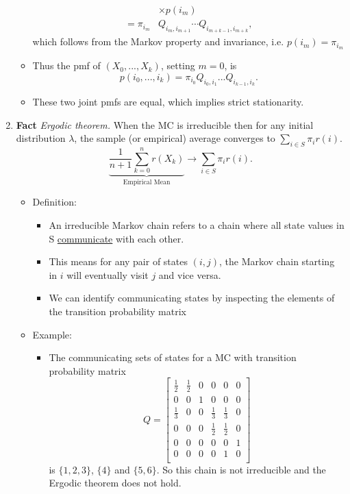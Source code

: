 \documentclass[12pt]{article}
\begin{document}
\begin{enumerate}
\begin{itemize}
\begin{align*}
               & \times p(i_{m}) \\
               =\pi_{i_m}&Q_{i_m,i_{m+1}}\cdots Q_{i_{m+k-1},i_{m+k}},
    \end{align*}                  
    which follows from the Markov property and invariance, i.e. $p(i_m)=\pi_{i_m}$
    \item Thus the pmf of $(X_0,...,X_k)$, setting $m=0$, is 
    \[
    p(i_0,...,i_k) = \pi_{i_0}Q_{i_0,i_1}...Q_{i_{k-1},i_k}.
    \]
    \item These two joint pmfs are equal, which implies strict stationarity.          
\end{itemize}
\item \textbf{Fact} \textit{Ergodic theorem.} When the MC is irreducible then for any initial distribution $\lambda$, the sample (or empirical) average converges to $\sum_{i\in S}\pi_i r(i)$.
\[
\underbrace{\frac{1}{n+1}\sum_{k=0}^n r(X_k)}_\text{Empirical Mean} \rightarrow \sum_{i \in S} \pi_i r(i).
\]
\begin{itemize}
    \item Definition:
    \begin{itemize}
    \item An irreducible Markov chain refers to a chain where all state values in S \underline{communicate} with each other.
    \item This means for any pair of states $(i,j)$, the Markov chain starting in $i$ will eventually visit $j$ and vice versa.
    \item We can identify communicating states by inspecting the elements of the transition probability matrix
    \end{itemize}
    \item Example:
    \begin{itemize}
        \item The communicating sets of states for a MC with transition probability matrix 
        \[
        Q = \begin{bmatrix}
        \frac{1}{2} & \frac{1}{2} & 0 & 0 & 0 & 0 \\
        0 & 0 & 1 & 0 & 0 & 0 \\
        \frac{1}{3} & 0 & 0 & \frac{1}{3} & \frac{1}{3} & 0 \\
        0 & 0 & 0 & \frac{1}{2} & \frac{1}{2} & 0 \\
        0 & 0 & 0 & 0 & 0 & 1 \\
        0 & 0 & 0 & 0 & 1 & 0 \\
        \end{bmatrix}
        \]
        is $\{1,2,3 \}$, $\{ 4\}$ and $\{5,6\}$. So this chain is not irreducible and the Ergodic theorem does not hold.
        

\end{itemize}
\end{itemize}
\end{enumerate}
\end{document}
